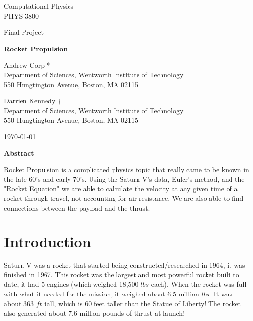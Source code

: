 \documentclass[11pt]{article}
\begin{document}
\begin{titlepage}

	\centering
	{\Large Computational Physics \\ PHYS 3800 \par}
	\vspace{0.25cm}
	{\Large Final Project\par}
	\vspace{2cm}
	
	{\huge \textbf{ Rocket Propulsion} \par}
	\vspace{1cm}
	
	{\large Andrew Corp * \\ Department of Sciences, Wentworth Institute of Technology \\ 550 Hungtington Avenue, Boston, MA 02115}\\
	
	\vspace{.25cm}
	
		{\large Darrien Kennedy $\dagger$ \\ Department of Sciences, Wentworth Institute of Technology \\ 550 Hungtington Avenue, Boston, MA 02115}

	\vspace{1cm}

	{\large \today \par}
\end{titlepage}
\newpage

{\centering \textbf{Abstract} \par}

Rocket Propulsion is a complicated physics topic that really came to be known in the late 60's and early 70's. Using the Saturn V's data, Euler's method, and the "Rocket Equation" we are able to calculate the velocity at any given time of a rocket through travel, not accounting for air resistance. We are also able to find connections between the payload and the thrust. 

\section{Introduction}
\par Saturn V was a rocket that started being constructed/researched in 1964, it was finished in 1967. This rocket was the largest and most powerful rocket built to date, it had 5 engines (which weighed 18,500 $lbs$ each). When the rocket was full with what it needed for the mission, it weighed about 6.5 million $lbs$. It was about 363 $ft$ tall, which is 60 feet taller than the Statue of Liberty! The rocket also generated about 7.6 million pounds of thrust at launch! 
\end{document}
